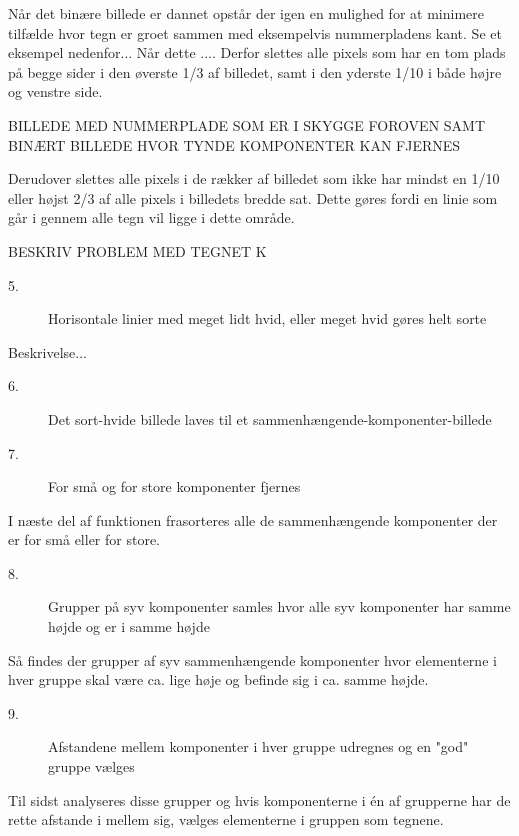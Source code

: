Når det binære billede er dannet opstår der igen en mulighed for at minimere tilfælde hvor tegn er groet sammen med eksempelvis nummerpladens kant. Se et eksempel nedenfor... Når dette .... Derfor slettes alle pixels som har en tom plads på begge sider i den øverste 1/3 af billedet, samt i den yderste 1/10 i både højre og venstre side.

BILLEDE MED NUMMERPLADE SOM ER I SKYGGE FOROVEN SAMT BINÆRT BILLEDE HVOR TYNDE KOMPONENTER KAN FJERNES

Derudover slettes alle pixels i de rækker af billedet som ikke har mindst en 1/10 eller højst 2/3 af alle pixels i billedets bredde sat. Dette gøres fordi en linie som går i gennem alle tegn vil ligge i dette område.

BESKRIV PROBLEM MED TEGNET K

\begin{description}
\item[5.] Horisontale linier med meget lidt hvid, eller meget hvid gøres helt sorte
\end{description}

Beskrivelse...

\begin{description}
\item[6.] Det sort-hvide billede laves til et sammenhængende-komponenter-billede
\item[7.] For små og for store komponenter fjernes
\end{description}

I næste del af funktionen frasorteres alle de sammenhængende komponenter der er for små eller for store.

\begin{description}
\item[8.] Grupper på syv komponenter samles hvor alle syv komponenter har samme højde og er i samme højde
\end{description}

Så findes der grupper af syv sammenhængende komponenter hvor elementerne i hver gruppe skal være ca. lige høje og befinde sig i ca. samme højde.

\begin{description}
\item[9.] Afstandene mellem komponenter i hver gruppe udregnes og en "god" gruppe vælges
\end{description}

Til sidst analyseres disse grupper og hvis komponenterne i én af grupperne har de rette afstande i mellem sig, vælges elementerne i gruppen som tegnene.


